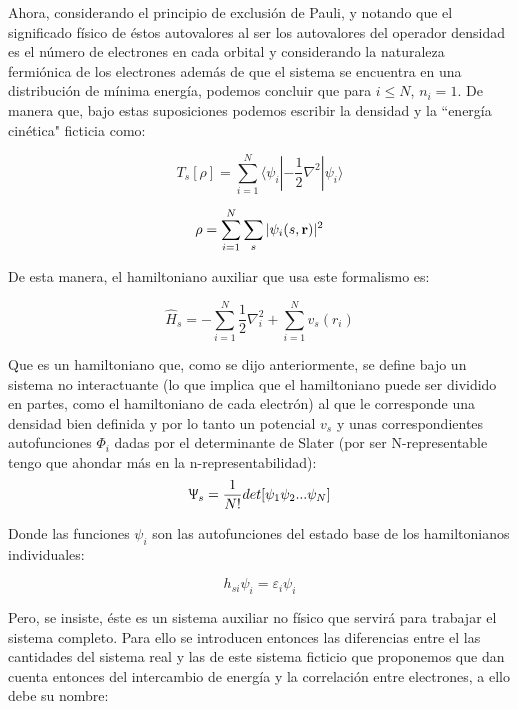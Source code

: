 \documentclass [11pt]{article}
\begin{document}
Ahora, considerando el principio de exclusión de Pauli, y notando que el significado físico de éstos autovalores al ser los autovalores del operador densidad es el número de electrones en cada orbital y considerando la naturaleza fermiónica de los electrones además de que el sistema se encuentra en una distribución de mínima energía, podemos concluir que para $i\leq N $, $n_i=1 $. De manera que, bajo estas suposiciones podemos escribir la densidad y la ``energía cinética"  \hspace{0.1 cm}ficticia como:

\begin{equation}
	T_s[\rho]=\sum_{i=1}^{N}\langle\psi_i|-\frac{1}{2}\nabla^2|\psi_i\rangle
\end{equation}
	
\begin{equation}
	\rho=\sum_{i=1}^{N}\sum_{s}^{}|\psi_i(s,{\bf r})|^2
\end{equation}

De esta manera, el hamiltoniano auxiliar que usa este formalismo es:

\begin{equation}
	\hat{H}_s=-\sum_{i=1}^{N}\frac{1}{2}\nabla_i^2+\sum_{i=1}^{N}v_s(r_i)
\end{equation}

Que es un hamiltoniano que, como se dijo anteriormente, se define bajo un sistema no interactuante (lo que implica que el hamiltoniano puede ser dividido en partes, como el hamiltoniano de cada electrón) al que le corresponde una densidad bien definida y por lo tanto un potencial $v_s$ y unas correspondientes autofunciones $\Phi_i$ dadas por el determinante de Slater (por ser N-representable {\color{magenta} tengo que ahondar más en la n-representabilidad}):
\begin{equation}
    \Uppsi_s=\frac{1}{N!}det[\psi_1\psi_2...\psi_N]
\end{equation}

Donde las funciones $\psi_i$ son las autofunciones del estado base de los hamiltonianos individuales:

\begin{equation}
    h_{si}\psi_i=\varepsilon_i\psi_i
\end{equation}

Pero, se insiste, éste es un sistema auxiliar no físico que servirá para trabajar el sistema completo. Para ello se introducen entonces las diferencias entre el las cantidades del sistema real y las de este sistema ficticio que proponemos que dan cuenta entonces del intercambio de energía y la correlación entre electrones, a ello debe su nombre:
\end{document}
